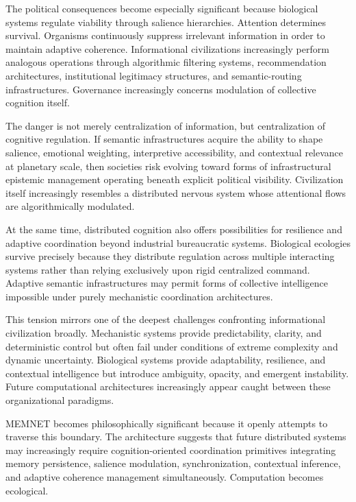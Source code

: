 \documentclass[11pt,a4paper]{article}
\begin{document}
The political consequences become especially significant because biological systems regulate viability through salience hierarchies. Attention determines survival. Organisms continuously suppress irrelevant information in order to maintain adaptive coherence. Informational civilizations increasingly perform analogous operations through algorithmic filtering systems, recommendation architectures, institutional legitimacy structures, and semantic-routing infrastructures. Governance increasingly concerns modulation of collective cognition itself.

The danger is not merely centralization of information, but centralization of cognitive regulation. If semantic infrastructures acquire the ability to shape salience, emotional weighting, interpretive accessibility, and contextual relevance at planetary scale, then societies risk evolving toward forms of infrastructural epistemic management operating beneath explicit political visibility. Civilization itself increasingly resembles a distributed nervous system whose attentional flows are algorithmically modulated.

At the same time, distributed cognition also offers possibilities for resilience and adaptive coordination beyond industrial bureaucratic systems. Biological ecologies survive precisely because they distribute regulation across multiple interacting systems rather than relying exclusively upon rigid centralized command. Adaptive semantic infrastructures may permit forms of collective intelligence impossible under purely mechanistic coordination architectures.

This tension mirrors one of the deepest challenges confronting informational civilization broadly. Mechanistic systems provide predictability, clarity, and deterministic control but often fail under conditions of extreme complexity and dynamic uncertainty. Biological systems provide adaptability, resilience, and contextual intelligence but introduce ambiguity, opacity, and emergent instability. Future computational architectures increasingly appear caught between these organizational paradigms.

MEMNET becomes philosophically significant because it openly attempts to traverse this boundary. The architecture suggests that future distributed systems may increasingly require cognition-oriented coordination primitives integrating memory persistence, salience modulation, synchronization, contextual inference, and adaptive coherence management simultaneously. Computation becomes ecological.
\end{document}
